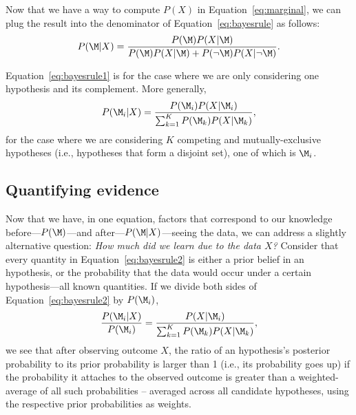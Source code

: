 Now that we have a way to compute $P(X)$ in Equation~\ref{eq:marginal}, we can plug the result into the denominator of Equation~\ref{eq:bayesrule} as follows: \begin{equation}\label{eq:bayesrule1}P(\M|X) = \frac{P(\M)P(X|\M)}{P(\M)P(X|\M) + P(\neg{\M})P(X|\neg{\M})}.\end{equation}

Equation~\ref{eq:bayesrule1} is for the case where we are only considering one hypothesis and its complement. More generally,
\begin{equation}
P(\M_i|X) = \frac{P(\M_i)P(X|\M_i)}{\sum_{k=1}^K P(\M_k)P(X|\M_k)},
\label{eq:bayesrule2}
\end{equation}
for the case where we are considering $K$ competing and mutually-exclusive hypotheses (i.e., hypotheses that form a disjoint set), one of which is $\M_i$. 


\subsection{Quantifying evidence}

Now that we have, in one equation, factors that correspond to our knowledge before---$P(\M)$---and after---$P(\M|X)$---seeing the data, we can address a slightly alternative question: \emph{How much did we learn due to the data $X$?} Consider that every quantity in Equation~\ref{eq:bayesrule2} is either a prior belief in an hypothesis, or the probability that the data would occur under a certain hypothesis---all known quantities. If we divide both sides of Equation~\ref{eq:bayesrule2} by $P(\M_i)$,
\begin{eqnarray}
\frac{P(\M_i|X)}{P(\M_i)} = \frac{P(X|\M_i)}{\sum_{k=1}^K P(\M_k)P(X|\M_k)},
\end{eqnarray}
we see that after observing outcome $X$, the ratio of an hypothesis's posterior probability to its prior probability is larger than 1 (i.e., its probability goes up) if {the probability it attaches to the observed outcome is greater than a weighted-average of all such probabilities -- averaged across all candidate hypotheses, using the respective prior probabilities as weights.}

